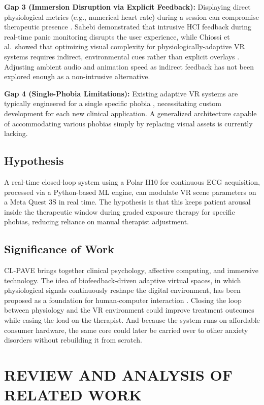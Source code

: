 \documentclass[conference]{IEEEtran}
\begin{document}
\textbf{Gap 3 (Immersion Disruption via Explicit Feedback):} Displaying direct physiological metrics (e.g., numerical heart rate) during a session can compromise therapeutic presence \cite{leong2025}. Sahebi \cite{sahebi2024} demonstrated that intrusive HCI feedback during real-time panic monitoring disrupts the user experience, while Chiossi et al.\ showed that optimizing visual complexity for physiologically-adaptive VR systems requires indirect, environmental cues rather than explicit overlays \cite{chiossi2024}. Adjusting ambient audio and animation speed as indirect feedback has not been explored enough as a non-intrusive alternative.

\textbf{Gap 4 (Single-Phobia Limitations):} Existing adaptive VR systems are typically engineered for a single specific phobia \cite{vet2025,mevlevio2024}, necessitating custom development for each new clinical application. A generalized architecture capable of accommodating various phobias simply by replacing visual assets is currently lacking.

\subsection{Hypothesis}

A real-time closed-loop system using a Polar H10 for continuous ECG acquisition, processed via a Python-based ML engine, can modulate VR scene parameters on a Meta Quest 3S in real time. The hypothesis is that this keeps patient arousal inside the therapeutic window during graded exposure therapy for specific phobias, reducing reliance on manual therapist adjustment.

\subsection{Significance of Work}

CL-PAVE brings together clinical psychology, affective computing, and immersive technology. The idea of biofeedback-driven adaptive virtual spaces, in which physiological signals continuously reshape the digital environment, has been proposed as a foundation for human-computer interaction \cite{ghandi2019}. Closing the loop between physiology and the VR environment could improve treatment outcomes while easing the load on the therapist. And because the system runs on affordable consumer hardware, the same core could later be carried over to other anxiety disorders without rebuilding it from scratch.

\section{REVIEW AND ANALYSIS OF RELATED WORK}
\end{document}
